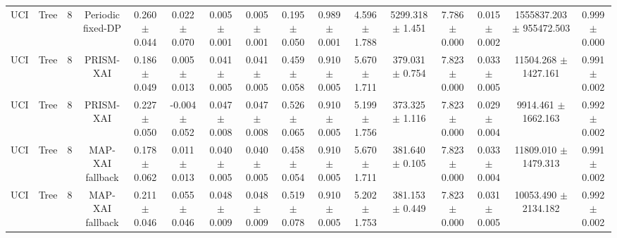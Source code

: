 \begin{tabular}{lccccccccccccccc}
UCI & Tree & 8 & Periodic fixed-DP & 0.260 $\pm$ 0.044 & 0.022 $\pm$ 0.070 & 0.005 $\pm$ 0.001 & 0.005 $\pm$ 0.001 & 0.195 $\pm$ 0.050 & 0.989 $\pm$ 0.001 & 4.596 $\pm$ 1.788 & 5299.318 $\pm$ 1.451 & 7.786 $\pm$ 0.000 & 0.015 $\pm$ 0.002 & 1555837.203 $\pm$ 955472.503 & 0.999 $\pm$ 0.000 \\
UCI & Tree & 8 & PRISM-XAI & 0.186 $\pm$ 0.049 & 0.005 $\pm$ 0.013 & 0.041 $\pm$ 0.005 & 0.041 $\pm$ 0.005 & 0.459 $\pm$ 0.058 & 0.910 $\pm$ 0.005 & 5.670 $\pm$ 1.711 & 379.031 $\pm$ 0.754 & 7.823 $\pm$ 0.000 & 0.033 $\pm$ 0.005 & 11504.268 $\pm$ 1427.161 & 0.991 $\pm$ 0.002 \\
UCI & Tree & 8 & PRISM-XAI & 0.227 $\pm$ 0.050 & -0.004 $\pm$ 0.052 & 0.047 $\pm$ 0.008 & 0.047 $\pm$ 0.008 & 0.526 $\pm$ 0.065 & 0.910 $\pm$ 0.005 & 5.199 $\pm$ 1.756 & 373.325 $\pm$ 1.116 & 7.823 $\pm$ 0.000 & 0.029 $\pm$ 0.004 & 9914.461 $\pm$ 1662.163 & 0.992 $\pm$ 0.002 \\
UCI & Tree & 8 & MAP-XAI fallback & 0.178 $\pm$ 0.062 & 0.011 $\pm$ 0.013 & 0.040 $\pm$ 0.005 & 0.040 $\pm$ 0.005 & 0.458 $\pm$ 0.054 & 0.910 $\pm$ 0.005 & 5.670 $\pm$ 1.711 & 381.640 $\pm$ 0.105 & 7.823 $\pm$ 0.000 & 0.033 $\pm$ 0.004 & 11809.010 $\pm$ 1479.313 & 0.991 $\pm$ 0.002 \\
UCI & Tree & 8 & MAP-XAI fallback & 0.211 $\pm$ 0.046 & 0.055 $\pm$ 0.046 & 0.048 $\pm$ 0.009 & 0.048 $\pm$ 0.009 & 0.519 $\pm$ 0.078 & 0.910 $\pm$ 0.005 & 5.202 $\pm$ 1.753 & 381.153 $\pm$ 0.449 & 7.823 $\pm$ 0.000 & 0.031 $\pm$ 0.005 & 10053.490 $\pm$ 2134.182 & 0.992 $\pm$ 0.002 \\
\bottomrule
\end{tabular}
